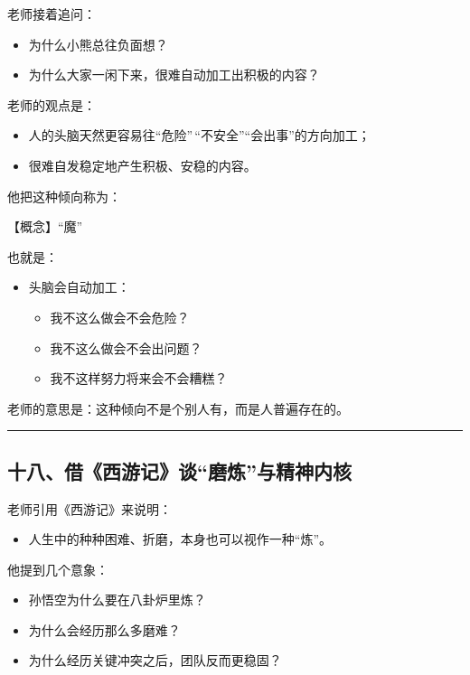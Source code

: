 \documentclass[
  chinese,
  9pt,
  a4paper,
]{ctexart}
\providecommand{\tightlist}{%
  \setlength{\itemsep}{0pt}\setlength{\parskip}{0pt}}
\begin{document}
老师接着追问：

\begin{itemize}
\tightlist
\item
  为什么小熊总往负面想？
\item
  为什么大家一闲下来，很难自动加工出积极的内容？
\end{itemize}

老师的观点是：

\begin{itemize}
\tightlist
\item
  人的头脑天然更容易往``危险''\,``不安全''``会出事''的方向加工；
\item
  很难自发稳定地产生积极、安稳的内容。
\end{itemize}

他把这种倾向称为：

【概念】``魔''

也就是：

\begin{itemize}
\item
  头脑会自动加工：

  \begin{itemize}
  \tightlist
  \item
    我不这么做会不会危险？
  \item
    我不这么做会不会出问题？
  \item
    我不这样努力将来会不会糟糕？
  \end{itemize}
\end{itemize}

老师的意思是：这种倾向不是个别人有，而是人普遍存在的。

\begin{center}\rule{0.5\linewidth}{0.5pt}\end{center}

\subsection{十八、借《西游记》谈``磨炼''与精神内核}\label{ux5341ux516bux501fux897fux6e38ux8bb0ux8c08ux78e8ux70bcux4e0eux7cbeux795eux5185ux6838}

老师引用《西游记》来说明：

\begin{itemize}
\tightlist
\item
  人生中的种种困难、折磨，本身也可以视作一种``炼''。
\end{itemize}

他提到几个意象：

\begin{itemize}
\tightlist
\item
  孙悟空为什么要在八卦炉里炼？
\item
  为什么会经历那么多磨难？
\item
  为什么经历关键冲突之后，团队反而更稳固？
\end{itemize}
\end{document}
